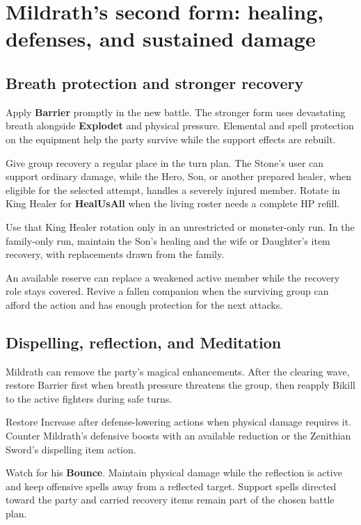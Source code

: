 \section{Mildrath's second form: healing, defenses, and sustained damage}

\subsection*{Breath protection and stronger recovery}

Apply \textbf{Barrier} promptly in the new battle.
The stronger form uses devastating breath alongside
\textbf{Explodet} and physical pressure. Elemental and
spell protection on the equipment help the party survive
while the support effects are rebuilt.

Give group recovery a regular place in the turn plan.
The Stone's user can support ordinary damage, while
the Hero, Son, or another prepared healer, when eligible
for the selected attempt, handles a severely injured member.
Rotate in King Healer for
\textbf{HealUsAll} when the living roster needs a
complete HP refill.

Use that King Healer rotation only in an unrestricted or monster-only
run. In the family-only run, maintain the Son's healing and the wife
or Daughter's item recovery, with replacements drawn from the family.

An available reserve can replace a weakened active
member while the recovery role stays covered. Revive
a fallen companion when the surviving group can afford
the action and has enough protection for the next attacks.

\subsection*{Dispelling, reflection, and Meditation}

Mildrath can remove the party's magical enhancements.
After the clearing wave, restore Barrier first when
breath pressure threatens the group, then reapply Bikill
to the active fighters during safe turns.

Restore Increase after defense-lowering actions when
physical damage requires it. Counter Mildrath's defensive
boosts with an available reduction or the Zenithian Sword's
dispelling item action.

Watch for his \textbf{Bounce}. Maintain physical damage
while the reflection is active and keep offensive spells
away from a reflected target. Support spells directed
toward the party and carried recovery items remain part
of the chosen battle plan.

